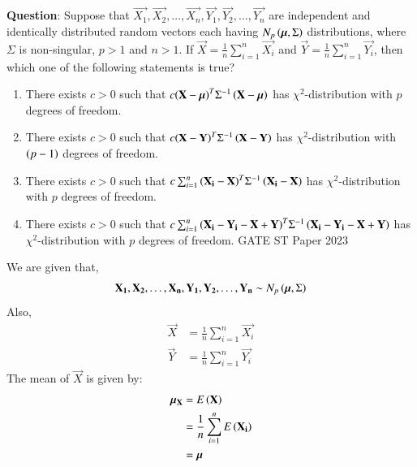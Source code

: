 \documentclass[journal,12pt,onecolumn]{IEEEtran}
\theoremstyle{remark}
\begin{document}
%
\textbf{Question}:
Suppose that $\vec{X_1}, \vec{X_2},\ldots, \vec{X_n}, \vec{Y_1}, \vec{Y_2},\ldots, \vec{Y_n}$ are independent and identically distributed random vectors each having $N_p\left(\bm{\mu},\Sigma\right)$ distributions, where $\Sigma$ is non-singular, $p>1$ and $n>1$. If $\vec{X} = \frac{1}{n}\sum_{i=1}^{n}\vec{X_i}$ and $\vec{Y} = \frac{1}{n}\sum_{i=1}^{n}\vec{Y_i}$, then which one of the following statements is true?
\begin{enumerate}[label=(\alph*)]
\item There exists $c>0$ such that $c{\left(\mathbf{X}-\bm{\mu}\right)}^T{\Sigma}^{-1}\left(\mathbf{X}-\bm{\mu}\right)$ has ${\chi}^2$-distribution with $p$ degrees of freedom.
\item There exists $c>0$ such that $c{\left(\mathbf{X}-\mathbf{Y}\right)^T}{\Sigma}^{-1}\left(\mathbf{X}-\mathbf{Y}\right)$ has ${\chi}^2$-distribution with $\left(p-1\right)$ degrees of freedom.
\item There exists $c>0$ such that $c\sum_{i=1}^n{\left(\mathbf{X_i}-\mathbf{X}\right)}^T{\Sigma}^{-1}\left(\mathbf{X_i}-\mathbf{X}\right)$ has ${\chi}^2$-distribution with $p$ degrees of freedom.
\item There exists $c>0$ such that $c\sum_{i=1}^n{\left(\mathbf{X_i}-\mathbf{Y_i}-\mathbf{X}+\mathbf{Y}\right)}^T{\Sigma}^{-1}\left(\mathbf{X_i}-\mathbf{Y_i}-\mathbf{X}+\mathbf{Y}\right)$ has ${\chi}^2$-distribution with $p$ degrees of freedom.   \hfill{GATE ST Paper 2023} 
\end{enumerate} 
\fi
\solution
\newline
We are given that,
\begin{align}
\mathbf{X_1}, \mathbf{X_2},\ldots, \mathbf{X_n}, \mathbf{Y_1}, \mathbf{Y_2},\ldots, \mathbf{Y_n} \sim N_p\left(\bm{\mu},\Sigma\right)
\end{align}
Also,
\begin{align}
\vec{X} &= \frac{1}{n}\sum_{i=1}^{n}\vec{X_i} \\
\vec{Y} &= \frac{1}{n}\sum_{i=1}^{n}\vec{Y_i} 
\end{align}
The mean of $\vec{X}$ is given by: 
\begin{align}
{\bm{\mu}}_{\vec{X}} &= E\brak{\vec{X}} \\
                                    &= \frac{1}{n}\sum_{i=1}^{n}E\brak{\vec{X_i}} \\
                                    &= \bm{\mu}  \label{eq:23/25/1}
\end{align}
\end{document}
